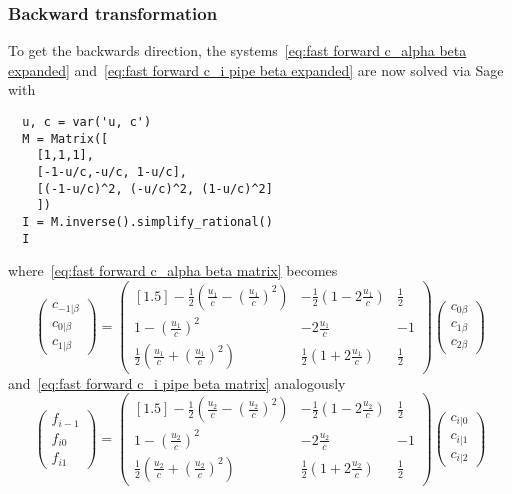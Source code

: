\documentclass{article}
\begin{document}
\subsubsection{Backward transformation}
\label{subs:Backward transformation}
To get the backwards direction, the systems~\eqref{eq:fast forward c_alpha beta expanded} and~\eqref{eq:fast forward c_i pipe beta expanded} are now solved via Sage with
\begin{verbatim}
  u, c = var('u, c')
  M = Matrix([
    [1,1,1],
    [-1-u/c,-u/c, 1-u/c],
    [(-1-u/c)^2, (-u/c)^2, (1-u/c)^2]
    ])
  I = M.inverse().simplify_rational()
  I
\end{verbatim}
where~\eqref{eq:fast forward c_alpha beta matrix} becomes
\begin{equation}
  \begin{pmatrix}
    c_{-1|\beta} \\
    c_{0|\beta} \\
    c_{1|\beta}
  \end{pmatrix}
  =
  \begin{pmatrix}[1.5]
    -\frac{1}{2}(\frac{u_1}{c} - {(\frac{u_1}{c})}^2) &
    -\frac{1}{2}(1 - 2\frac{u_1}{c}) &
    \frac{1}{2} \\
    1 - {(\frac{u_1}{c})}^2  &
    -2\frac{u_1}{c}  &
    -1 \\
    \frac{1}{2}(\frac{u_1}{c} + {(\frac{u_1}{c})}^2)  &
    \frac{1}{2}(1 + 2\frac{u_1}{c})  &
    \frac{1}{2}
  \end{pmatrix}
  \begin{pmatrix}
    c_{0\beta} \\
    c_{1\beta} \\
    c_{2\beta}
  \end{pmatrix}
\end{equation}
and~\eqref{eq:fast forward c_i pipe beta matrix} analogously
\begin{equation}
  \begin{pmatrix}
    f_{i-1} \\
    f_{i0} \\
    f_{i1}
  \end{pmatrix}
  =
  \begin{pmatrix}[1.5]
    -\frac{1}{2}(\frac{u_2}{c} - {(\frac{u_2}{c})}^2) &
    -\frac{1}{2}(1 - 2\frac{u_2}{c}) &
    \frac{1}{2} \\
    1 - {(\frac{u_2}{c})}^2  &
    -2\frac{u_2}{c}  &
    -1 \\
    \frac{1}{2}(\frac{u_2}{c} + {(\frac{u_2}{c})}^2)  &
    \frac{1}{2}(1 + 2\frac{u_2}{c})  &
    \frac{1}{2}
  \end{pmatrix}
  \begin{pmatrix}
      c_{i|0} \\
      c_{i|1} \\
      c_{i|2}
    \end{pmatrix}
\end{equation}
\end{document}
